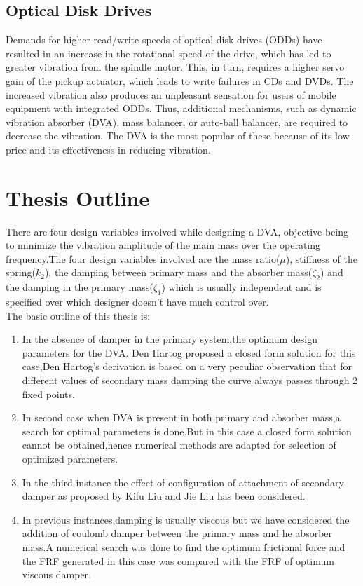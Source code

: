 \subsection{Optical Disk Drives}
Demands for higher read/write speeds of optical disk drives (ODDs) have resulted in an increase in the rotational speed of the drive, which has led to greater vibration from the spindle motor. This, in turn, requires a higher servo gain of the pickup actuator, which leads to write failures in CDs and DVDs. The increased vibration also produces an unpleasant sensation for users of mobile equipment with integrated ODDs. Thus, additional mechanisms, such as dynamic vibration absorber (DVA), mass balancer, or auto-ball balancer, are required to decrease the vibration. The DVA is the most popular of these because of its low price and its effectiveness in reducing vibration.

\section{Thesis Outline}
There are four design variables involved while designing a DVA, objective being to minimize the vibration amplitude of the main mass over the operating frequency.The four design variables involved are the mass ratio($\mu$), stiffness of the spring($k_2$), the damping between primary mass and the absorber mass($\zeta_2$) and the damping in the primary mass($\zeta_1$) which is usually independent and is specified over which designer doesn't have much control over.\\

The basic outline of this thesis is:
\begin{enumerate}[1.]
\item In the absence of damper in the primary system,the optimum design parameters for the DVA. Den Hartog proposed a closed form solution for this case,Den Hartog’s derivation is based on a very peculiar observation that for different values of secondary mass damping the curve always passes through 2 fixed points.
\item In second case when DVA is present in both primary and absorber mass,a search for optimal parameters is done.But in this case a closed form solution cannot be obtained,hence numerical methods are adapted for selection of optimized parameters.
\item In the third instance the effect of configuration of attachment of secondary damper as proposed by Kifu Liu and Jie Liu has been considered.
\item In previous instances,damping is usually viscous but we have considered the addition of coulomb damper between the primary mass and he absorber mass.A numerical search was done to find the optimum frictional force and the FRF generated in this case was compared with the FRF of optimum viscous damper. 
\end{enumerate}

%
                       
